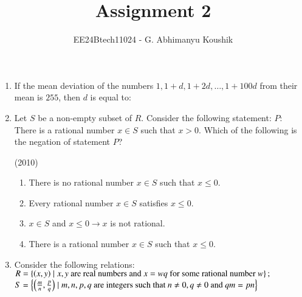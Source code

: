 \documentclass[journal,12pt,twocolumn]{IEEEtran}
\theoremstyle{remark}
\begin{document}
\title{Assignment 2}
\author{EE24Btech11024 - G. Abhimanyu Koushik}
\maketitle
\newpage
\bigskip
\renewcommand{\thefigure}{\theenumi}
\renewcommand{\thetable}{\theenumi}
\begin{enumerate}
    \item If the mean deviation of the numbers $1, 1+d, 1+2d, \dots, 1+100d$ from their mean is $255$, then $d$ is equal to:
    
    \hfill{}
    \begin{enumerate}
    \end{enumerate}
    
    \item Let $S$ be a non-empty subset of $R$. Consider the following statement:\newline
    $P$: There is a rational number $x \in S$ such that $x>0$.\newline
    Which of the following is the negation of statement $P$?
    
    \hfill{(2010)}
    \begin{enumerate}
    \item There is no rational number $x \in S$ such that $x \leq 0$.
    \item Every rational number $x \in S$ satisfies $x \leq 0$.
    \item $x \in S$ and $x \leq 0 \longrightarrow x$ is not rational.
    \item There is a rational number $x \in S$ such that $x \leq 0$.
    \end{enumerate}
    
    \item Consider the following relations: \newline
    $R = \left\{\left(x, y\right) \mid x,y \text{ are real numbers and } x = wq \text{ for some rational number } w\right\};$ \newline
    $S = \left\{\left(\frac{m}{n}, \frac{p}{q}\right) \mid m, n, p, q \text{ are integers such that } n \neq 0, q \neq 0 \text{ and } qm = pn\right\}$
    

\end{enumerate}
\end{document}
